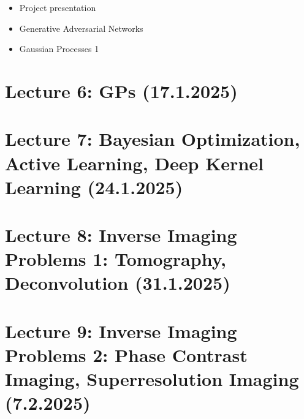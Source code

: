 \documentclass[
]{agujournal2019}
\providecommand{\tightlist}{%
  \setlength{\itemsep}{0pt}\setlength{\parskip}{0pt}}\usepackage{longtable,booktabs,array}
\begin{document}
\begin{itemize}
\tightlist
\item
  Project presentation
\item
  Generative Adversarial Networks
\item
  Gaussian Processes 1
\end{itemize}

\section{Lecture 6: GPs (17.1.2025)}\label{sec-lecture7}

\section{Lecture 7: Bayesian Optimization, Active Learning, Deep Kernel
Learning (24.1.2025)}\label{sec-lecture8}

\section{Lecture 8: Inverse Imaging Problems 1: Tomography,
Deconvolution (31.1.2025)}\label{sec-lecture9}

\section{Lecture 9: Inverse Imaging Problems 2: Phase Contrast Imaging,
Superresolution Imaging (7.2.2025)}\label{sec-lecture10}
\end{document}
